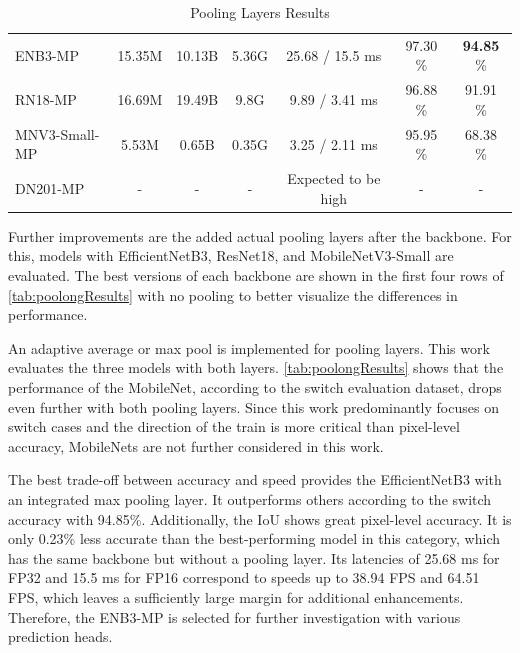 \begin{table}[H]
{\begin{minipage}{0.95\textwidth}
\begin{tabular}{lcccccc}
            \hline
            \rowcolor[gray]{0.9} ENB3-MP       & 15.35M            & 10.13B         & 5.36G          & 25.68 / 15.5 ms         & 97.30 \%          & \textbf{94.85} \% \\ 
            \rowcolor{white}     RN18-MP       & 16.69M            & 19.49B         & 9.8G           & 9.89 / 3.41 ms          & 96.88 \%          & 91.91 \% \\ 
            \rowcolor[gray]{0.9} MNV3-Small-MP & 5.53M             & 0.65B          & 0.35G          & 3.25 / 2.11 ms          & 95.95 \%          & 68.38 \% \\ 
            \rowcolor{white}     DN201-MP      & -                 & -              & -              & Expected to be high     & -                 & - \\ 
            \hline
        \end{tabular}
    \end{minipage}
    }
    \caption{Pooling Layers Results}
    \label{tab:poolongResults}
\end{table}

Further improvements are the added actual pooling layers after the backbone.
For this, models with EfficientNetB3, ResNet18, and MobileNetV3-Small are evaluated.
The best versions of each backbone are shown in the first four rows of \autoref{tab:poolongResults} with no pooling to better visualize the differences in performance.

An adaptive average or max pool is implemented for pooling layers.
This work evaluates the three models with both layers.
\autoref{tab:poolongResults} shows that the performance of the MobileNet, according to the switch evaluation dataset, drops even further with both pooling layers.
Since this work predominantly focuses on switch cases and the direction of the train is more critical than pixel-level accuracy, MobileNets are not further considered in this work.

The best trade-off between accuracy and speed provides the EfficientNetB3 with an integrated max pooling layer.
It outperforms others according to the switch accuracy with 94.85\%.
Additionally, the \ac{IoU} shows great pixel-level accuracy.
It is only 0.23\% less accurate than the best-performing model in this category, which has the same backbone but without a pooling layer.
Its latencies of 25.68 ms for FP32 and 15.5 ms for FP16 correspond to speeds up to 38.94 \ac{FPS} and 64.51 \ac{FPS}, which leaves a sufficiently large margin for additional enhancements.
Therefore, the ENB3-MP is selected for further investigation with various prediction heads.

